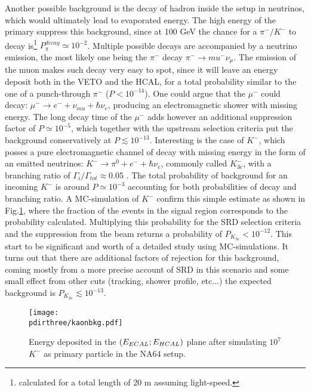Another possible background is the decay of hadron inside the setup in neutrinos, which would ultimately lead to evaporated energy. The high energy of the primary suppress this background, since at 100 GeV the chance for a $\pi^-/K^-$ to decay is\footnote{calculated for a total length of 20 m assuming light-speed.} $P^{decay}_{\pi} \simeq  10^{-2}$. Multiple possible decays are accompanied by a neutrino emission, the most likely one being the $\pi^-$ decay $\pi^- \rightarrow mu^- \nu_{\mu}$. The emission of the muon makes such decay very easy to spot, since it will leave an energy deposit both in the VETO and the HCAL, for a total probability similar to the one of a punch-through $\pi^-$ ($P < 10^{-14}$). One could argue that the $\mu^-$ could decay: $\mu^- \rightarrow e^- + \nu_{mu}+ \hbar{\nu_{e}}$, producing an electromagnetic shower with missing energy. The long decay time of the $\mu^-$ adds however an additional suppression factor of $P\simeq 10^{-5}$, which together with the upstream selection criteria put the background conservatively at $P \lesssim 10^{-13}$. Interesting is the case of $K^-$, which posses a pure electromagnetic channel of decay with missing energy in the form of an emitted neutrinos: $K^- \rightarrow \pi^0 + e^- + \hbar{\nu_e}$, commonly called $K^-_{3e}$, with a branching ratio of $\Gamma_i/\Gamma_{tot} \approx$0.05 \cite{particle-strange-mesons}. The total probability of background for an incoming $K^-$ is around $P\simeq 10^{-3}$ accounting for both probabilities of decay and branching ratio. A MC-simulation of $K^-$ confirm this simple estimate as shown in Fig.\ref{fig:kaonbkg-sim}, where the fraction of the events in the signal region corresponds to the probability calculated. Multiplying this probability for the SRD selection criteria and the suppression from the beam returns a probability of $P_{K_{3e}} < 10^{-12}$. %
This start to be significant and worth of a detailed study using MC-simulations. It turns out that there are additional factors of rejection for this background, coming mostly from a more precise account of SRD in this scenario and some small effect from other cuts (tracking, shower profile, etc...) the expected background is $P_{K_{3e}} \lesssim 10^{-13}$.


\begin{figure}[bth!]
  \centering
  \texttt{[image: \\pdirthree/kaonbkg.pdf]}
  \caption[$K^-$ simulation ]{Energy deposited in the $(E_{ECAL};E_{HCAL})$ plane after simulating $10^7$ $K^-$ as primary particle in the NA64 setup.}
  \label{fig:kaonbkg-sim}
\end{figure}

